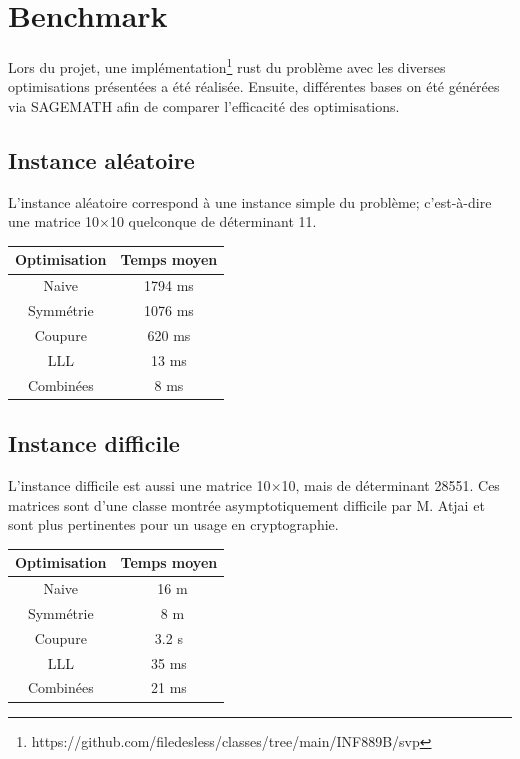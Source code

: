 \documentclass{article}
\begin{document}
\section{Benchmark}

Lors du projet, une implémentation\footnote{https://github.com/filedesless/classes/tree/main/INF889B/svp} rust du problème avec les diverses optimisations présentées a été réalisée. Ensuite, différentes bases on été générées via SAGEMATH afin de comparer l'efficacité des optimisations.

\subsection{Instance aléatoire}

L'instance aléatoire correspond à une instance simple du problème; c'est-à-dire une matrice 10$\times$10 quelconque de déterminant 11.

\begin{center}
    \begin{tabular}{ |c|c| }
        \hline
        Optimisation & Temps moyen \\
        \hline
        Naive & 1794 ms \\
        Symmétrie & 1076 ms \\
        Coupure & 620 ms \\
        LLL & 13 ms \\
        \hline
        Combinées & 8 ms \\
        \hline
    \end{tabular}
\end{center}

\subsection{Instance difficile}

L'instance difficile est aussi une matrice 10$\times$10, mais de déterminant 28551. Ces matrices sont d'une classe montrée asymptotiquement difficile par M. Atjai\cite{hard} et sont plus pertinentes pour un usage en cryptographie.

\begin{center}
    \begin{tabular}{ |c|c| }
        \hline
        Optimisation & Temps moyen \\
        \hline
        Naive & ~16 m \\
        Symmétrie & ~8 m \\
        Coupure & 3.2 s \\
        LLL & 35 ms \\
        \hline
        Combinées & 21 ms \\
        \hline
    \end{tabular}
\end{center}
\end{document}
